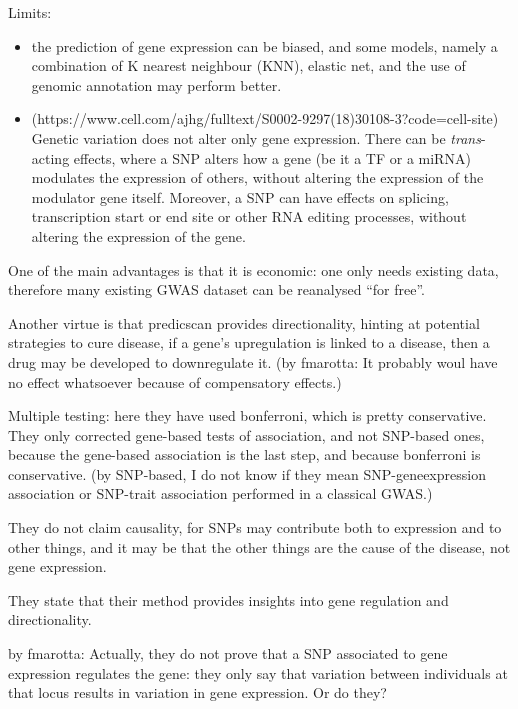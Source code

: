 \documentclass[../main.tex]{subfiles}
\begin{document}
Limits:
\begin{itemize}
	\item
the prediction of gene expression can be biased, and some models, namely 
a combination of K nearest neighbour (KNN), elastic net, and the use of 
genomic annotation may perform better.
	\item 
(https://www.cell.com/ajhg/fulltext/S0002-9297(18)30108-3?code=cell-site) 
Genetic variation does not alter only gene expression. There can be 
\textit{trans}-acting effects, where a SNP alters how a gene (be it a TF 
or a miRNA) modulates the expression of others, without altering the 
expression of the modulator gene itself. Moreover, a SNP can have 
effects on splicing, transcription start or end site or other RNA 
editing processes, without altering the expression of the gene.
\end{itemize}

One of the main advantages is that it is economic: one only needs 
existing data, therefore many existing GWAS dataset can be reanalysed 
\enquote{for free}.

Another virtue is that predicscan provides directionality, hinting at 
potential strategies to cure disease, \eg if a gene's upregulation is 
linked to a disease, then a drug may be developed to downregulate it. 
(by fmarotta: It probably woul have no effect whatsoever because of 
compensatory effects.)

Multiple testing: here they have used bonferroni, which is pretty 
conservative. They only corrected gene-based tests of association, and 
not SNP-based ones, because the gene-based association is the last step, 
and because bonferroni is conservative. (by SNP-based, I do not know if 
they mean SNP-geneexpression association or SNP-trait association 
performed in a classical GWAS.)

They do not claim causality, for SNPs may contribute both to expression 
and to other things, and it may be that the other things are the cause 
of the disease, not gene expression.

They state that their method provides insights into gene regulation and 
directionality.

by fmarotta: Actually, they do not prove that a SNP associated to gene 
expression regulates the gene: they  only say that variation between 
individuals at that locus results in variation in gene expression. Or do 
they?
\end{document}

